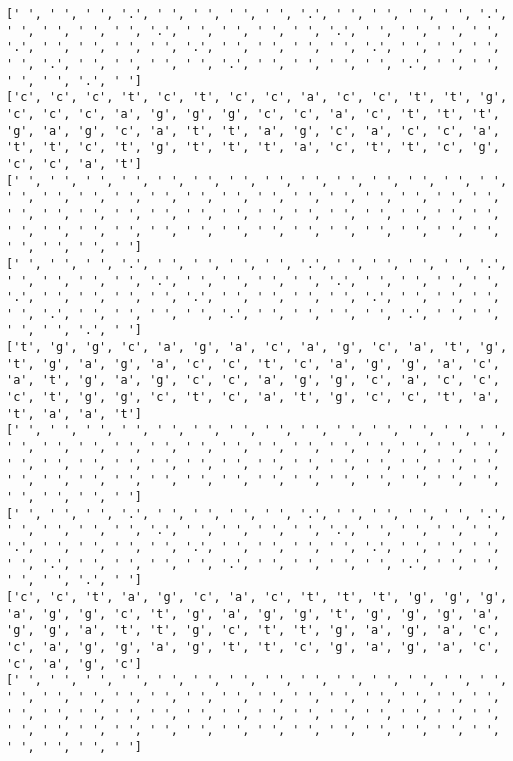 \documentclass{article}
\begin{document}
\begin{Verbatim}
[' ', ' ', ' ', '.', ' ', ' ', ' ', ' ', '.', ' ', ' ', ' ', ' ', '.', ' ', ' ', ' ', ' ', '.', ' ', ' ', ' ', ' ', '.', ' ', ' ', ' ', ' ', '.', ' ', ' ', ' ', ' ', '.', ' ', ' ', ' ', ' ', '.', ' ', ' ', ' ', ' ', '.', ' ', ' ', ' ', ' ', '.', ' ', ' ', ' ', ' ', '.', ' ', ' ', ' ', ' ', '.', ' ']
['c', 'c', 'c', 't', 'c', 't', 'c', 'c', 'a', 'c', 'c', 't', 't', 'g', 'c', 'c', 'c', 'a', 'g', 'g', 'g', 'c', 'c', 'a', 'c', 't', 't', 't', 'g', 'a', 'g', 'c', 'a', 't', 't', 'a', 'g', 'c', 'a', 'c', 'c', 'a', 't', 't', 'c', 't', 'g', 't', 't', 't', 'a', 'c', 't', 't', 'c', 'g', 'c', 'c', 'a', 't']
[' ', ' ', ' ', ' ', ' ', ' ', ' ', ' ', ' ', ' ', ' ', ' ', ' ', ' ', ' ', ' ', ' ', ' ', ' ', ' ', ' ', ' ', ' ', ' ', ' ', ' ', ' ', ' ', ' ', ' ', ' ', ' ', ' ', ' ', ' ', ' ', ' ', ' ', ' ', ' ', ' ', ' ', ' ', ' ', ' ', ' ', ' ', ' ', ' ', ' ', ' ', ' ', ' ', ' ', ' ', ' ', ' ', ' ', ' ', ' ']
[' ', ' ', ' ', '.', ' ', ' ', ' ', ' ', '.', ' ', ' ', ' ', ' ', '.', ' ', ' ', ' ', ' ', '.', ' ', ' ', ' ', ' ', '.', ' ', ' ', ' ', ' ', '.', ' ', ' ', ' ', ' ', '.', ' ', ' ', ' ', ' ', '.', ' ', ' ', ' ', ' ', '.', ' ', ' ', ' ', ' ', '.', ' ', ' ', ' ', ' ', '.', ' ', ' ', ' ', ' ', '.', ' ']
['t', 'g', 'g', 'c', 'a', 'g', 'a', 'c', 'a', 'g', 'c', 'a', 't', 'g', 't', 'g', 'a', 'g', 'a', 'c', 'c', 't', 'c', 'a', 'g', 'g', 'a', 'c', 'a', 't', 'g', 'a', 'g', 'c', 'c', 'a', 'g', 'g', 'c', 'a', 'c', 'c', 'c', 't', 'g', 'g', 'c', 't', 'c', 'a', 't', 'g', 'c', 'c', 't', 'a', 't', 'a', 'a', 't']
[' ', ' ', ' ', ' ', ' ', ' ', ' ', ' ', ' ', ' ', ' ', ' ', ' ', ' ', ' ', ' ', ' ', ' ', ' ', ' ', ' ', ' ', ' ', ' ', ' ', ' ', ' ', ' ', ' ', ' ', ' ', ' ', ' ', ' ', ' ', ' ', ' ', ' ', ' ', ' ', ' ', ' ', ' ', ' ', ' ', ' ', ' ', ' ', ' ', ' ', ' ', ' ', ' ', ' ', ' ', ' ', ' ', ' ', ' ', ' ']
[' ', ' ', ' ', '.', ' ', ' ', ' ', ' ', '.', ' ', ' ', ' ', ' ', '.', ' ', ' ', ' ', ' ', '.', ' ', ' ', ' ', ' ', '.', ' ', ' ', ' ', ' ', '.', ' ', ' ', ' ', ' ', '.', ' ', ' ', ' ', ' ', '.', ' ', ' ', ' ', ' ', '.', ' ', ' ', ' ', ' ', '.', ' ', ' ', ' ', ' ', '.', ' ', ' ', ' ', ' ', '.', ' ']
['c', 'c', 't', 'a', 'g', 'c', 'a', 'c', 't', 't', 't', 'g', 'g', 'g', 'a', 'g', 'g', 'c', 't', 'g', 'a', 'g', 'g', 't', 'g', 'g', 'g', 'a', 'g', 'g', 'a', 't', 't', 'g', 'c', 't', 't', 'g', 'a', 'g', 'a', 'c', 'c', 'a', 'g', 'g', 'a', 'g', 't', 't', 'c', 'g', 'a', 'g', 'a', 'c', 'c', 'a', 'g', 'c']
[' ', ' ', ' ', ' ', ' ', ' ', ' ', ' ', ' ', ' ', ' ', ' ', ' ', ' ', ' ', ' ', ' ', ' ', ' ', ' ', ' ', ' ', ' ', ' ', ' ', ' ', ' ', ' ', ' ', ' ', ' ', ' ', ' ', ' ', ' ', ' ', ' ', ' ', ' ', ' ', ' ', ' ', ' ', ' ', ' ', ' ', ' ', ' ', ' ', ' ', ' ', ' ', ' ', ' ', ' ', ' ', ' ', ' ', ' ', ' ']

\end{Verbatim}
\end{document}
